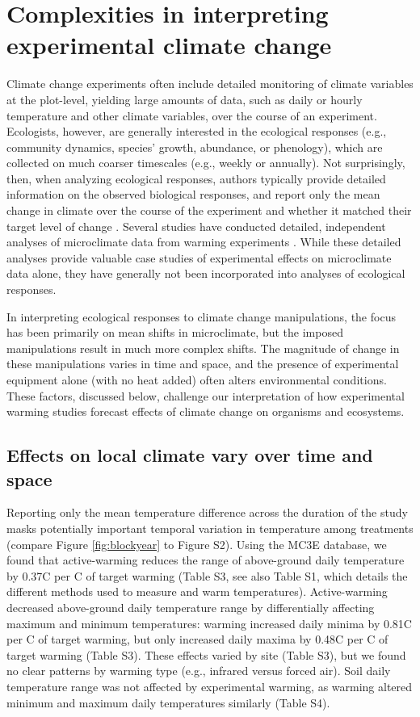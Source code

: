 \documentclass{article}
\begin{document}
\section* {Complexities in interpreting experimental climate change} 
Climate change experiments often include detailed monitoring of climate variables at the plot-level, yielding large amounts of data, such as daily or hourly temperature and other climate variables, over the course of an experiment. Ecologists, however, are generally interested in the ecological responses (e.g., community dynamics, species' growth, abundance, or phenology), which are collected on much coarser timescales (e.g., weekly or annually). Not surprisingly, then, when analyzing ecological responses, authors typically provide detailed information on the observed biological responses, and report only the mean change in climate over the course of the experiment and whether it matched their target level of change \citep[e.g.,][]{price1998,rollinson2012,clark2014a,clark2014b}. Several studies have conducted detailed, independent analyses of microclimate data from warming experiments \citep[e.g.,][]{harte1995b,kimball2005,kimball2008,mcdaniel2014, pelini2011}. While these detailed analyses provide valuable case studies of experimental effects on microclimate data alone, they have generally not been incorporated into analyses of ecological responses. 

\par In interpreting ecological responses to climate change manipulations, the focus  has been primarily on mean shifts in microclimate, but the imposed manipulations result in much more complex shifts. The magnitude of change in these manipulations varies in time and space, and the presence of experimental equipment alone (with no heat added) often alters environmental conditions. These factors, discussed below, challenge our interpretation of how experimental warming studies forecast effects of climate change on organisms and ecosystems.

\subsection* {Effects on local climate vary over time and space}
Reporting only the mean temperature difference across the duration of the study masks potentially important temporal variation in temperature among treatments (compare Figure \ref{fig:blockyear} to Figure S2). Using the MC3E database, we found that active-warming reduces the range of above-ground daily temperature by 0.37\degree C per \degree C of target warming (Table S3, see also Table S1, which details the different methods used to measure and warm temperatures). Active-warming decreased above-ground daily temperature range by differentially affecting maximum and minimum temperatures: warming increased daily minima by 0.81\degree C per \degree C of target warming, but only increased daily maxima by 0.48\degree C per \degree C of target warming (Table S3). These effects varied by site (Table S3), but we found no clear patterns by warming type (e.g., infrared versus forced air). Soil daily temperature range was not affected by experimental warming, as warming altered minimum and maximum daily temperatures similarly (Table S4).
\end{document}

